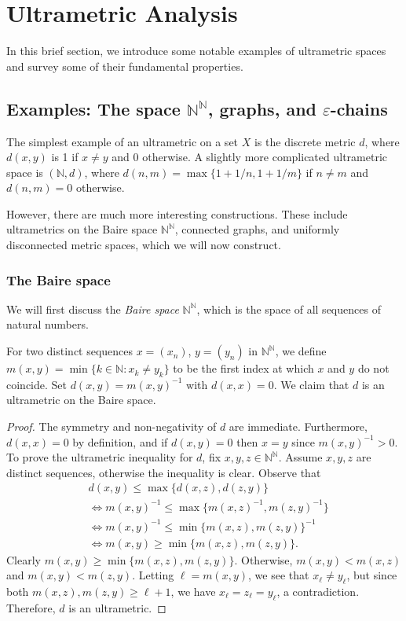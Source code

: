 \section{Ultrametric Analysis}
In this brief section, we introduce some notable examples of ultrametric spaces and survey some of their fundamental properties.
\subsection{Examples: The space \( \mathbb{N} ^{\mathbb{N} } \), graphs, and \( \varepsilon  \)-chains} The simplest example of an ultrametric on a set $X$ is the discrete metric $d$, where $d(x,y)$ is 1 if $x \neq y$ and 0 otherwise. A slightly more complicated ultrametric space is \( (\mathbb{N} , d) \), where \( d(n,m) = \max \{ 1 + 1/n , 1 + 1/m \}  \) if \( n \neq m \) and \( d(n, m) = 0 \) otherwise.

However, there are much more interesting constructions. These include ultrametrics on the Baire space $\mathbb{N} ^{\mathbb{N} }$, connected graphs, and uniformly disconnected metric spaces, which we will now construct.

\subsubsection{The Baire space} We will first discuss the \emph{Baire space} \( \mathbb{N} ^{\mathbb{N} }  \), which is the space of all sequences of natural numbers.

For two distinct sequences \( x =  (x_{n}) \), \( y = (y_{n} ) \) in \( \mathbb{N}^{\mathbb{N}}   \), we define \( m(x,y) = \min \{ k \in \mathbb{N} : x_{k} \neq y_{k}  \}  \) to be the first index at which \( x \) and \( y \) do not coincide. Set \( d(x,y) = m(x,y)^{-1}  \) with \( d(x,x) = 0 \). We claim that \( d \) is an ultrametric on the Baire space.
\begin{proof}
The symmetry and non-negativity of \( d \) are immediate. Furthermore, \( d(x,x) = 0 \) by definition, and if \( d(x,y) = 0  \) then \( x = y \) since \( m(x,y)^{-1} > 0 \). To prove the ultrametric inequality for \( d \), fix \( x,y,z \in \mathbb{N} ^{\mathbb{N} }  \). Assume \( x,y,z \) are distinct sequences, otherwise the inequality is clear. Observe that
\begin{align*}
	&d(x,y) \leq \max \{ d(x,z), d(z,y) \} \\
	&\Leftrightarrow m(x,y)^{-1} \leq \max \{ m(x,z)^{-1} , m(z,y)^{-1}  \}  \\
	&\Leftrightarrow m(x,y)^{-1}  \leq \min \{ m(x,z), m(z,y) \} ^{-1} \\
	&\Leftrightarrow m(x,y) \geq \min \{ m(x,z), m(z,y) \}.
\end{align*}
Clearly \( m(x,y) \geq \min \{ m(x,z), m(z,y) \}  \). Otherwise, \( m(x,y) < m(x,z) \) and \( m(x,y) < m(z,y) \). Letting \( \ell = m(x,y) \), we see that \( x_{\ell} \neq y_{\ell}  \), but since both \( m(x,z), m(z,y) \geq \ell + 1 \), we have \( x_{\ell} = z_{\ell} = y_{\ell}  \), a contradiction. Therefore, \( d \) is an ultrametric.
\end{proof}
